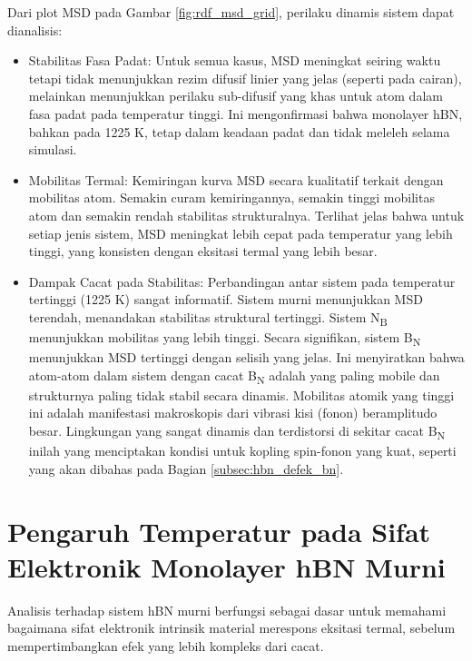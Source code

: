 Dari plot MSD pada Gambar \ref{fig:rdf_msd_grid}, perilaku dinamis sistem dapat dianalisis:
\begin{itemize}
    \item Stabilitas Fasa Padat: Untuk semua kasus, MSD meningkat seiring waktu tetapi tidak menunjukkan rezim difusif linier yang jelas (seperti pada cairan), melainkan menunjukkan perilaku sub-difusif yang khas untuk atom dalam fasa padat pada temperatur tinggi.
Ini mengonfirmasi bahwa monolayer hBN, bahkan pada 1225 K, tetap dalam keadaan padat dan tidak meleleh selama simulasi.
\item Mobilitas Termal: Kemiringan kurva MSD secara kualitatif terkait dengan mobilitas atom.
Semakin curam kemiringannya, semakin tinggi mobilitas atom dan semakin rendah stabilitas strukturalnya.
Terlihat jelas bahwa untuk setiap jenis sistem, MSD meningkat lebih cepat pada temperatur yang lebih tinggi, yang konsisten dengan eksitasi termal yang lebih besar.
\item Dampak Cacat pada Stabilitas: Perbandingan antar sistem pada temperatur tertinggi (1225 K) sangat informatif.
Sistem murni menunjukkan MSD terendah, menandakan stabilitas struktural tertinggi. Sistem N\textsubscript{B} menunjukkan mobilitas yang lebih tinggi.
Secara signifikan, sistem B\textsubscript{N} menunjukkan MSD tertinggi dengan selisih yang jelas.
Ini menyiratkan bahwa atom-atom dalam sistem dengan cacat B\textsubscript{N} adalah yang paling mobile dan strukturnya paling tidak stabil secara dinamis.
Mobilitas atomik yang tinggi ini adalah manifestasi makroskopis dari vibrasi kisi (fonon) beramplitudo besar.
Lingkungan yang sangat dinamis dan terdistorsi di sekitar cacat B\textsubscript{N} inilah yang menciptakan kondisi untuk kopling spin-fonon yang kuat, seperti yang akan dibahas pada Bagian \ref{subsec:hbn_defek_bn}.
\end{itemize}

\section{Pengaruh Temperatur pada Sifat Elektronik Monolayer hBN Murni}
\label{sec:hbn_murni}
Analisis terhadap sistem hBN murni berfungsi sebagai dasar untuk memahami bagaimana sifat elektronik intrinsik material merespons eksitasi termal, sebelum mempertimbangkan efek yang lebih kompleks dari cacat.
